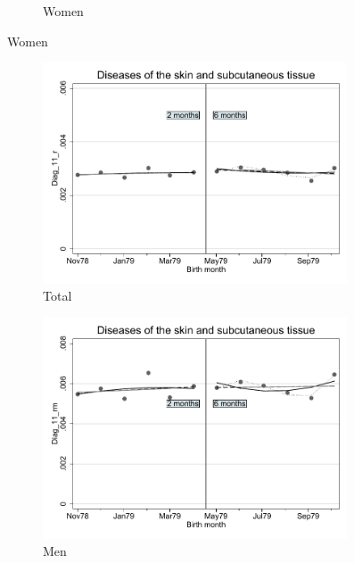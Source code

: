 \documentclass[a4paper ]{article}
\begin{document}
\begin{figure}[h!]
\begin{subfigure}[t]{0.31\textwidth}
		\caption{Women}
	\end{subfigure}
\end{figure}
\newpage
\begin{figure}[h]
	\centering
	\begin{subfigure}[t]{0.31\textwidth}
		\centering
		\includegraphics[width=0.99\textwidth]{R1_RD_Diag_11_r_fits}
		\caption{Total}		
	\end{subfigure}
	\begin{subfigure}[t]{0.31\textwidth}
		\centering
		\includegraphics[width=0.99\textwidth]{R1_RD_Diag_11_rm_fits}
		\caption{Men}		
	\end{subfigure}
	\quad
	\begin{subfigure}[t]{0.31\textwidth}

\end{subfigure}
\end{figure}
\end{document}
